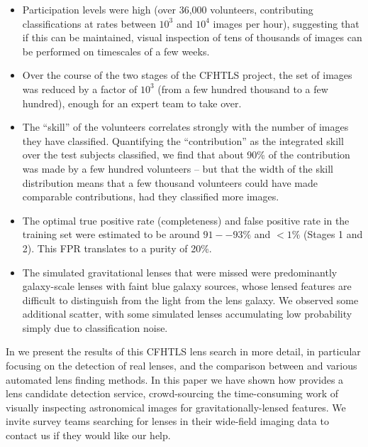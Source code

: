 \documentclass[useAMS,usenatbib,a4paper]{mn2e}
\begin{document}
\begin{itemize}

\item Participation levels were high (over 36,000 volunteers, contributing
classifications at rates between $10^3$ and $10^4$ images per hour), suggesting
that if this can be maintained, visual inspection of tens of thousands of images
can be performed on timescales of a few weeks.

\item Over the course of the two stages of the CFHTLS project, the
set of images was reduced by a factor of $10^3$ (from a few hundred thousand to
a few hundred), enough for an expert team to take over.

\item The ``skill'' of the volunteers correlates strongly with the number of
images they have classified.  Quantifying the ``contribution'' as the integrated
skill over the test subjects  classified, we find that about 90\% of the
contribution was made by a few  hundred volunteers -- but that the width of the
skill distribution means that a  few thousand volunteers could have made
comparable contributions, had they classified more images.

\item The optimal true positive rate (completeness) and false positive rate in
the training set were estimated to be around $91--93\%$ and $<1\%$ (Stages 1 and
2). This  FPR translates to a purity of 20\%.

\item The simulated gravitational lenses that were missed were predominantly
galaxy-scale lenses with faint blue galaxy sources, whose lensed features are
difficult to distinguish from the light from the lens galaxy. We observed some
additional scatter, with some simulated lenses accumulating low probability
simply due to classification noise.

\end{itemize}

In \PaperTwo we present the results of this CFHTLS lens search in more detail,
in particular focusing on the detection of real lenses, and the comparison
between \SW and various automated lens finding methods. In this paper  we have
shown how \SW provides a lens candidate detection service, crowd-sourcing the
time-consuming work of visually inspecting astronomical images for
gravitationally-lensed features. We invite survey teams searching for lenses in
their wide-field imaging data to contact us if they would like our help.
\end{document}
